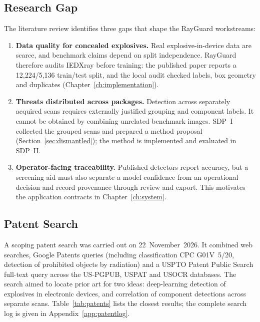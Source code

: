 \subsection{Research Gap}
The literature review identifies three gaps that shape the RayGuard workstreams:
\begin{enumerate}
\item \textbf{Data quality for concealed explosives.} Real explosive-in-device data
are scarce, and benchmark claims depend on split independence. RayGuard therefore
audits IEDXray before training: the published paper reports a 12,224/5,136
train/test split, and the local audit checked labels, box geometry and duplicates
(Chapter~\ref{ch:implementation}).
\item \textbf{Threats distributed across packages.} Detection across separately
acquired scans requires externally justified grouping and component labels. It
cannot be obtained by combining unrelated benchmark images. SDP~I collected the
grouped scans and prepared a method proposal (Section~\ref{sec:dismantled}); the
method is implemented and evaluated in SDP~II.
\item \textbf{Operator-facing traceability.} Published detectors report accuracy,
but a screening aid must also separate a model confidence from an operational
decision and record provenance through review and export. This motivates the
application contracts in Chapter~\ref{ch:system}.
\end{enumerate}

\subsection{Patent Search}
A scoping patent search was carried out on 22~November~2026. It combined web
searches, Google Patents queries (including classification CPC G01V~5/20,
detection of prohibited objects by radiation) and a USPTO Patent Public Search
full-text query across the US-PGPUB, USPAT and USOCR databases. The search aimed
to locate prior art for two ideas: deep-learning detection of explosives in
electronic devices, and correlation of component detections across separate
scans. Table~\ref{tab:patents} lists the closest results; the complete search log
is given in Appendix~\ref{app:patentlog}.


